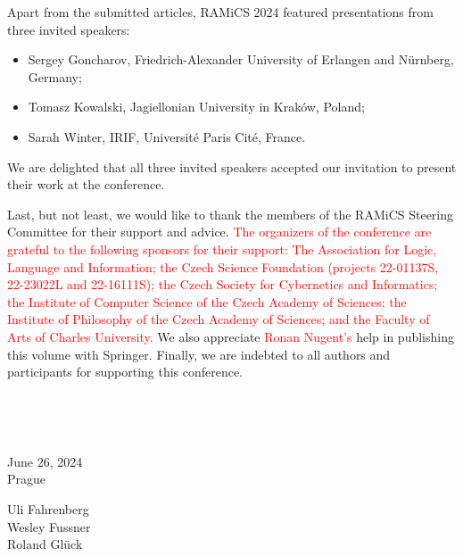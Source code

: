 \documentclass{llncs}
\newcommand{\red}[1]{\textcolor{red}{#1}}
\begin{document}
Apart from the submitted articles, RAMiCS 2024 featured presentations from 
three invited speakers:
\begin{itemize}
\item Sergey Goncharov, Friedrich-Alexander University of Erlangen and Nürnberg, Germany;
\item Tomasz Kowalski, Jagiellonian University in Kraków, Poland;
\item Sarah Winter, IRIF, Université Paris Cité, France.
\end{itemize}
We are delighted that all three invited speakers accepted our invitation to 
present their work at the conference.

Last, but not least, we would like to thank the members of the RAMiCS
Steering Committee for their support and advice. \red{The organizers of the conference are grateful to the following sponsors for their support: The Association for Logic, Language and Information; the Czech Science Foundation (projects 22-01137S, 22-23022L and 22-16111S); the Czech Society for Cybernetics and Informatics; the Institute of Computer Science of the Czech Academy of Sciences; the Institute of Philosophy of the Czech Academy of Sciences; and the Faculty of Arts of Charles University.}
We also appreciate \red{Ronan Nugent's} help in publishing this volume with Springer. Finally, we
are indebted to all authors and participants for supporting this
conference.

 



~\bigskip


\noindent
\begin{minipage}[t]{.4\textwidth}
June 26, 2024\\
Prague
\end{minipage}%
\hfill
\begin{minipage}[t]{.4\textwidth}\flushright
  Uli Fahrenberg \\
  Wesley Fussner \\
  Roland Gl\"uck
\end{minipage}
\end{document}
